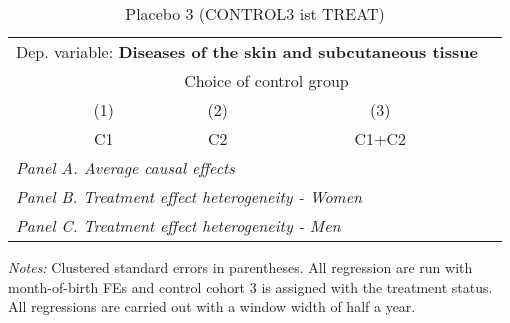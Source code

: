  \begin{table}[H] \centering \begin{threeparttable} \caption{Placebo 3 (CONTROL3 ist TREAT) } {\def\sym#1{\ifmmode^{#1}\else\(^{#1}\)\fi} \begin{tabular}{l*{4}{c}} \toprule \multicolumn{4}{l}{Dep. variable: \textbf{Diseases of the skin and subcutaneous tissue}} \\ & \multicolumn{3}{c}{Choice of control group} \\ \cmidrule(lr){2-4}
            &\multicolumn{1}{c}{(1)}&\multicolumn{1}{c}{(2)}&\multicolumn{1}{c}{(3)}\\
            &\multicolumn{1}{c}{C1}&\multicolumn{1}{c}{C2}&\multicolumn{1}{c}{C1+C2}\\
\midrule
 \multicolumn{4}{l}{\emph{Panel A. Average causal effects}} \\      \midrule\multicolumn{4}{l}{\emph{Panel B. Treatment effect heterogeneity - Women}} \\      \midrule\multicolumn{4}{l}{\emph{Panel C. Treatment effect heterogeneity - Men}} \\      
\bottomrule \end{tabular} } \begin{tablenotes} \item \scriptsize \emph{Notes:} Clustered standard errors in parentheses. All regression are run with month-of-birth FEs and control cohort 3 is assigned with the treatment status. All regressions are carried out with a window width of half a year. \end{tablenotes} \end{threeparttable} \end{table} 
